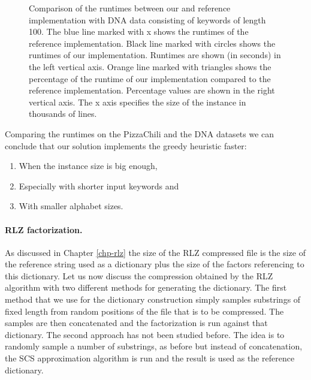 \documentclass[english,twoside,censored,csm,algorithms-track-2020]{HYthesisML}
\theoremstyle{plain}
\theoremstyle{definition}
\begin{document}
\begin{figure}[t]
\caption{Comparison of the runtimes between our and reference implementation with DNA data consisting
  of keywords of length 100. The blue line marked with x shows the runtimes of the reference
  implementation. Black line marked with circles shows the runtimes of our implementation. Runtimes are
  shown (in seconds) in the left vertical axis. Orange line marked with triangles shows the percentage
  of the runtime of our implementation compared to the reference implementation. Percentage values
  are shown in the right vertical axis. The x axis specifies the size of the instance in thousands
  of lines. }
  \label{fig-dna}
\end{figure}

\vspace{1cm}
  Comparing the runtimes on the PizzaChili and the DNA datasets we can conclude that
  our solution implements the greedy heuristic faster:

  \begin{enumerate}
  \item When the instance size is big enough,
  \item Especially with shorter input keywords and
  \item With smaller alphabet sizes.
  \end{enumerate}

\paragraph{RLZ factorization.}
As discussed in Chapter \ref{chp-rlz} the size of the RLZ compressed file is the size of the reference
string used as a dictionary plus the size of the factors referencing to this dictionary. Let us now
discuss the compression obtained by the RLZ algorithm with two different methods for generating the dictionary.
The first method that we use for the dictionary construction simply samples substrings of
fixed length from random positions of the file that is to be compressed.
The samples are then concatenated and the
factorization is run against that dictionary. The second approach has not been studied before. The
idea is to randomly sample a number of substrings, as before but instead of
concatenation, the SCS approximation algorithm is run and the result is used as the reference
dictionary.
\end{document}
